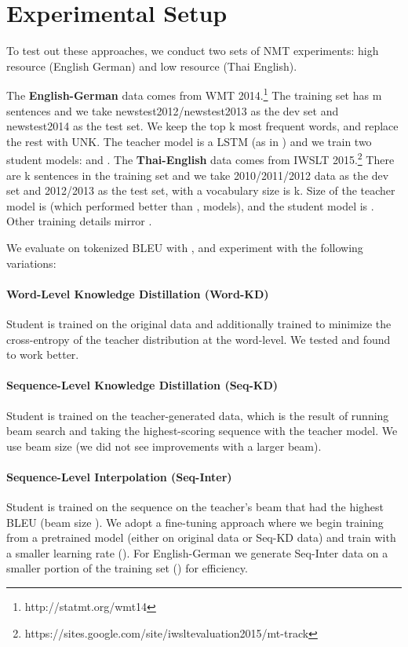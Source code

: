 \documentclass[11pt,letterpaper]{article}
\begin{document}
\section{Experimental Setup}
To test out these approaches, 
we conduct two sets of NMT experiments:  high resource (English  German) and low resource
(Thai  English).

The \textbf{English-German} data comes from WMT 2014.\footnote{http://statmt.org/wmt14}
The training set has m sentences and we take  newstest2012/newstest2013
as the dev set and newstest2014 as the test set. We keep the top k most
frequent words, and replace the rest with UNK. The teacher model
is a  LSTM (as in ) and we train two student models:
 and .
The \textbf{Thai-English} data comes from IWSLT 2015.\footnote{https://sites.google.com/site/iwsltevaluation2015/mt-track}
There are k sentences in the training set and we take 2010/2011/2012 data as the dev set and
2012/2013 as the test set, with a vocabulary size is k. Size of the teacher model is  
(which performed better than ,  models), and the student model is . 
Other training details mirror .

We evaluate on tokenized BLEU with  , and experiment with the following variations:
\paragraph{Word-Level Knowledge Distillation (Word-KD)} Student is 
trained on the original data and additionally trained to minimize the cross-entropy of
the teacher distribution at the word-level. We tested  and found
 to work better.
 \paragraph{Sequence-Level Knowledge Distillation (Seq-KD)} Student is trained on
  the teacher-generated data, which is the result of running beam search
  and taking the highest-scoring sequence with the teacher model. We use beam size  (we did not see
improvements with a larger beam).
 \paragraph{Sequence-Level Interpolation (Seq-Inter)} Student is trained on the sequence on
  the teacher's beam that had the highest BLEU (beam size ). We adopt a fine-tuning approach where we begin training from a pretrained model 
(either on original data or Seq-KD data) and train with a smaller learning rate (). 
 For English-German we generate Seq-Inter data on a smaller portion of the
 training set  () for efficiency.
\end{document}
